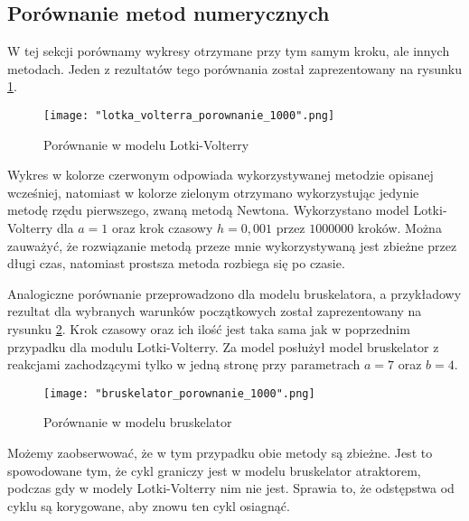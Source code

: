 \documentclass[10pt, a4paper, twoside, onecolumn]{article}
\numberwithin{equation}{section}
\begin{document}
	\subsection{Porównanie metod numerycznych}
	W tej sekcji porównamy wykresy otrzymane przy tym samym kroku, ale innych metodach. Jeden z rezultatów tego porównania został zaprezentowany na rysunku \ref{lotka_volterra_porownanie_1000}.
	\begin{figure}
		\centering
		\texttt{[image: "lotka\_volterra\_porownanie\_1000".png]}
		\caption{Porównanie w modelu Lotki-Volterry}
		\label{lotka_volterra_porownanie_1000}
	\end{figure}
	Wykres w kolorze czerwonym odpowiada wykorzystywanej metodzie opisanej wcześniej, natomiast w kolorze zielonym otrzymano wykorzystując jedynie metodę rzędu pierwszego, zwaną metodą Newtona. Wykorzystano model Lotki-Volterry dla \(a=1\) oraz krok czasowy \(h=0,001\) przez \(1000000\) kroków. Można zauważyć, że rozwiązanie metodą przeze mnie wykorzystywaną jest zbieżne przez długi czas, natomiast prostsza metoda rozbiega się po czasie. \par
	Analogiczne porównanie przeprowadzono dla modelu bruskelatora, a przykładowy rezultat dla wybranych warunków początkowych został zaprezentowany na rysunku \ref{bruskelator_porownanie_1000}. Krok czasowy oraz ich ilość jest taka sama jak w poprzednim przypadku dla modulu Lotki-Volterry. Za model posłużył model bruskelator z reakcjami zachodzącymi tylko w jedną stronę przy parametrach \(a=7\) oraz \(b=4\).
	
	\begin{figure}
		\centering
		\texttt{[image: "bruskelator\_porownanie\_1000".png]}
		\caption{Porównanie w modelu bruskelator}
		\label{bruskelator_porownanie_1000}
	\end{figure}
	Możemy zaobserwować, że w tym przypadku obie metody są zbieżne. Jest to spowodowane tym, że cykl graniczy jest w modelu bruskelator atraktorem, podczas gdy w modely Lotki-Volterry nim nie jest. Sprawia to, że odstępstwa od cyklu są korygowane, aby znowu ten cykl osiagnąć. \par
	
	
\end{document}
